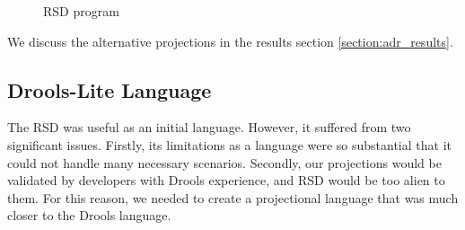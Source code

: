 \begin{figure}
    \centering
    \caption{RSD program}
    \label{fig:RSDProgram}
\end{figure}

We discuss the alternative projections in the results section \ref{section:adr_results}.

\subsection{Drools-Lite Language}
\label{section:DroolsLite}

The RSD was useful as an initial language. 
However, it suffered from two significant issues.
Firstly, its limitations as a language were so substantial that it could not handle many necessary scenarios.
Secondly, our projections would be validated by developers with Drools experience, and RSD would be too alien to them.
For this reason, we needed to create a projectional language that was much closer to the Drools language.

